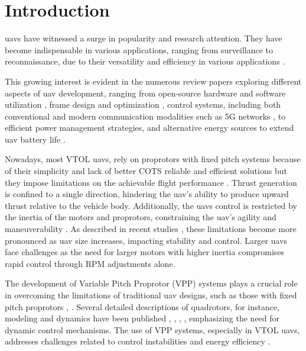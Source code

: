 \chapter{Introduction}
\label{chap:Chapter1}

\glspl{uav} have witnessed a surge in popularity and research attention.
They have become indispensable in various applications, ranging from surveillance to reconnaissance, due to their versatility and efficiency in various applications \cite{UAV1}.

This growing interest is evident in the numerous review papers exploring different aspects of \gls{uav} development, ranging from open-source hardware and software utilization \cite{UAV2}, frame design and optimization \cite{UAV5}, control systems, including both conventional and modern communication modalities such as 5G networks \cite{UAV7}, to efficient power management strategies, and alternative energy sources to extend \gls{uav} battery life \cite{UAV12}. %

Nowadays, most \gls{VTOL} \glspl{uav}, rely on proprotors with fixed pitch systems because of their simplicity and lack of better \gls{COTS} reliable and efficient solutions but they impose limitations on the achievable flight performance \cite{FPP1}.
Thrust generation is confined to a single direction, hindering the \gls{uav}'s ability to produce upward thrust relative to the vehicle body.
Additionally, the \glspl{uav} control is restricted by the inertia of the motors and proprotors, constraining the \gls{uav}'s agility and maneuverability \cite{FPP1}.
As described in recent studies \cite{FPP1}, these limitations become more pronounced as \gls{uav} size increases, impacting stability and control.
Larger \glspl{uav} face challenges as the need for larger motors with higher inertia compromises rapid control through \gls{RPM} adjustments alone.

The development of Variable Pitch Proprotor (VPP) systems plays a crucial role in overcoming the limitations of traditional \gls{uav} designs, such as those with fixed pitch proprotors \cite{FPP1}, \cite{VPP1}.
Several detailed descriptions of quadrotors, for instance, modeling and dynamics have been published \cite{FPP2}, \cite{FPP3}, \cite{FPP4}, \cite{FPP5}, emphasizing the need for dynamic control mechanisms.
The use of VPP systems, especially in \gls{VTOL} \glspl{uav}, addresses challenges related to control instabilities and energy efficiency \cite{VPP1}.

